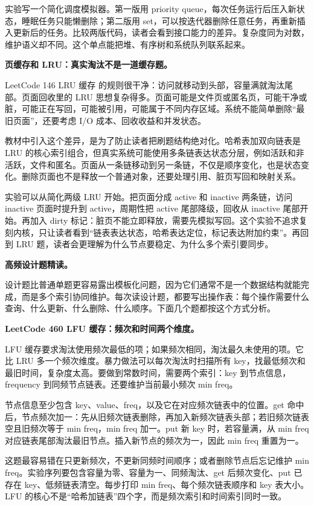 实验写一个简化调度模拟器。第一版用 priority queue，每次任务运行后压入新状态，睡眠任务只能懒删除；第二版用 set，可以按迭代器删除任意任务，再重新插入更新后的任务。比较两版代码，读者会看到接口能力的差异。复杂度同为对数，维护语义却不同。这个单点能把堆、有序树和系统队列联系起来。

\noindent\textbf{页缓存和 LRU：真实淘汰不是一道缓存题。}

LeetCode 146 LRU 缓存 的规则很干净：访问就移动到头部，容量满就淘汰尾部。页面回收里的 LRU 思想复杂得多。页面可能是文件页或匿名页，可能干净或脏，可能正在写回，可能被引用，可能属于不同内存区域。系统不能简单删除“最旧页面”，还要考虑 I/O 成本、回收收益和并发状态。

教材中引入这个差异，是为了防止读者把刷题结构绝对化。哈希表加双向链表是 LRU 的核心索引组合，但真实系统可能使用多条链表达状态分层，例如活跃和非活跃，文件和匿名。页面从一条链移动到另一条链，不仅是顺序变化，也是状态变化。删除页面也不是释放一个普通对象，还要处理引用、脏页写回和映射关系。

实验可以从简化两级 LRU 开始。把页面分成 active 和 inactive 两条链，访问 inactive 页面时提升到 active，周期性把 active 尾部降级，回收从 inactive 尾部开始。再加入 dirty 标记：脏页不能立即释放，需要先模拟写回。这个实验不追求复刻内核，只让读者看到“链表表达状态，哈希表达定位，标记表达附加约束”。再回到 LRU 题，读者会更理解为什么节点要稳定、为什么多个索引要同步。

\noindent\textbf{高频设计题精读。}

设计题比普通单题更容易露出模板化问题，因为它们通常不是一个数据结构就能完成，而是多个索引协同维护。每次读设计题，都要写出操作表：每个操作需要什么查询、什么更新、什么删除、什么顺序。下面几个题都按这个方式分析。

\noindent\textbf{LeetCode 460 LFU 缓存：频次和时间两个维度。}

LFU 缓存要求淘汰使用频次最低的项；如果频次相同，淘汰最久未使用的项。它比 LRU 多一个频次维度。暴力做法可以每次淘汰时扫描所有 key，找最低频次和最旧时间，复杂度太高。要做到常数时间，需要两个索引：key 到节点信息，frequency 到同频节点链表。还要维护当前最小频次 min freq。

节点信息至少包含 key、value、freq，以及它在对应频次链表中的位置。get 命中后，节点频次加一：先从旧频次链表删除，再加入新频次链表头部；若旧频次链表空且旧频次等于 min freq，min freq 加一。put 新 key 时，若容量满，从 min freq 对应链表尾部淘汰最旧节点。插入新节点的频次为一，因此 min freq 重置为一。

这题最容易错在只更新频次，不更新同频时间顺序；或者删除节点后忘记维护 min freq。实验序列要包含容量为零、容量为一、同频淘汰、get 后频次变化、put 已存在 key、低频链表清空。每步打印 min freq、每个频次链表顺序和 key 表大小。LFU 的核心不是“哈希加链表”四个字，而是频次索引和时间索引同时一致。

